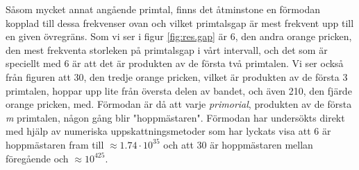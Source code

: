 Såsom mycket annat angående primtal, finns det åtminstone en förmodan kopplad till dessa frekvenser ovan och vilket primtalsgap är mest frekvent upp till en given övregräns. 
Som vi ser i figur \ref{fig:res.gap} är 6, den andra orange pricken, den mest frekventa storleken på primtalsgap i vårt intervall, och det som är speciellt med 6 är att det är produkten av de första två primtalen. 
Vi ser också från figuren att 30, den tredje orange pricken, vilket är produkten av de första 3 primtalen, hoppar upp lite från översta delen av bandet, och även 210, den fjärde orange pricken, med. Förmodan är då att varje \textit{primorial}, produkten av de första \textit{m} primtalen, någon gång blir "hoppmästaren".
Förmodan har undersökts direkt med hjälp av numeriska uppskattningsmetoder \cite{primeGaps} som har lyckats visa att 6 är hoppmästaren fram till \(\approx 1.74\cdot10^{35}\) och att 30 är hoppmästaren mellan föregående och \(\approx 10^{425}\).

